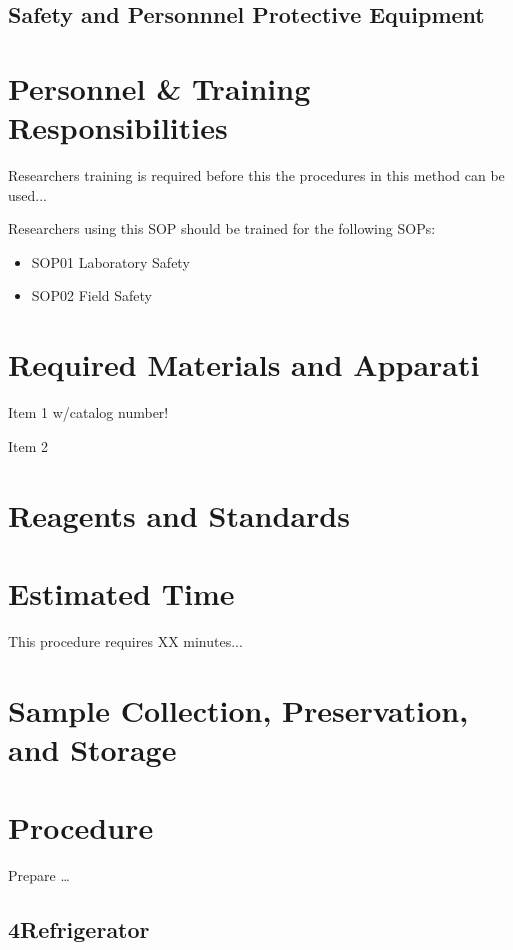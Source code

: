 \documentclass[12pt]{../SOP3_alpha}
\begin{document}
\subsection*{Safety and Personnnel Protective Equipment}


\section{Personnel \& Training Responsibilities}

\NP Researchers training is required before this the procedures in this method can be used... 

\NP Researchers using this SOP should be trained for the following SOPs:

\begin{itemize}
  \item SOP01 Laboratory Safety
  \item SOP02 Field Safety
\end{itemize}

\section{Required Materials and Apparati}

\NP Item 1 w/catalog number!

\NP Item 2

\section{Reagents and Standards}

\section{Estimated Time}

\NP This procedure requires XX minutes...

\section{Sample Collection, Preservation, and Storage}

\section{Procedure}

\NP Prepare \dots
\subsection{4\degree Refrigerator}
\end{document}
